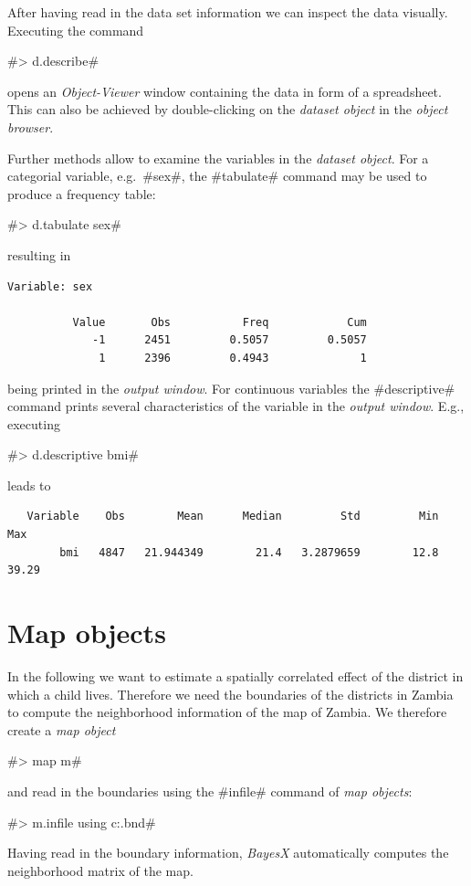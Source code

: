 \documentclass[11pt,a4paper,twoside]{bayesxreport}
\begin{document}
After having read in the data set information we can inspect the
data visually. Executing the command

#> d.describe#

opens an {\it Object-Viewer} window containing the data in form of a
spreadsheet. This can also be achieved by double-clicking on the
{\it dataset object} in the {\it object browser}.

Further methods allow to examine the variables in the {\it dataset
object}. For a categorial variable, e.g.~#sex#, the #tabulate#
command may be used to produce a frequency table:

#> d.tabulate sex#

resulting in

\begin{verbatim}
Variable: sex

          Value       Obs           Freq            Cum
             -1      2451         0.5057         0.5057
              1      2396         0.4943              1
\end{verbatim}

being printed in the {\it output window}. For continuous variables
the #descriptive# command prints several characteristics of the
variable in the {\em output window}. E.g., executing

#> d.descriptive bmi#

leads to

\begin{verbatim}
   Variable    Obs        Mean      Median         Std         Min         Max
        bmi   4847   21.944349        21.4   3.2879659        12.8       39.29
\end{verbatim}

\section{Map objects}\label{zambia_reml_maps}

In the following we want to estimate a spatially correlated effect
of the district in which a child lives. Therefore we need the
boundaries of the districts in Zambia to compute the neighborhood
information of the map of Zambia. We therefore create a {\it map
object}

#> map m#

and read in the boundaries using the #infile# command of {\it map
objects}:

#> m.infile using c:\data\zambia.bnd#

Having read in the boundary information, {\it BayesX} automatically
computes the neighborhood matrix of the map.
\end{document}
